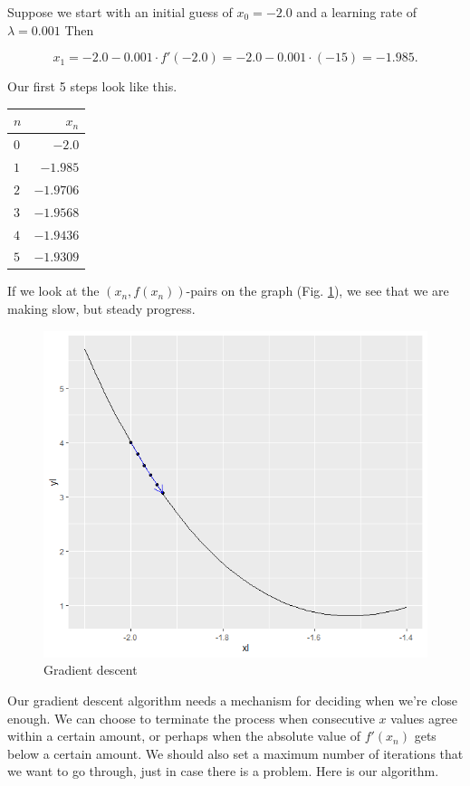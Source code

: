 \documentclass[
]{book}
\theoremstyle{definition}
\theoremstyle{definition}
\theoremstyle{definition}
\theoremstyle{definition}
\theoremstyle{remark}
\begin{document}
Suppose we start with an initial guess of \(x_0=-2.0\) and a learning rate of \(\lambda=0.001\) Then

\[x_1=-2.0-0.001\cdot f'(-2.0)=-2.0-0.001\cdot(-15)=-1.985.\]

Our first 5 steps look like this.

\begin{longtable}[]{@{}lr@{}}
\toprule\noalign{}
\(n\) & \(x_n\) \\
\midrule\noalign{}
\endhead
\bottomrule\noalign{}
\endlastfoot
\(0\) & \(-2.0\) \\
\(1\) & \(-1.985\) \\
\(2\) & \(-1.9706\) \\
\(3\) & \(-1.9568\) \\
\(4\) & \(-1.9436\) \\
\(5\) & \(-1.9309\) \\
\end{longtable}

If we look at the \((x_n,f(x_n))\)-pairs on the graph (Fig. \ref{fig:GD3}), we see that we are making slow, but steady progress.

\begin{figure}

{\centering \includegraphics[width=0.75\linewidth]{images/gd1} 

}

\caption{Gradient descent}\label{fig:GD3}
\end{figure}

Our gradient descent algorithm needs a mechanism for deciding when we're close enough. We can choose to terminate the process when consecutive \(x\) values agree within a certain amount, or perhaps when the absolute value of \(f'(x_n)\) gets below a certain amount. We should also set a maximum number of iterations that we want to go through, just in case there is a problem. Here is our algorithm.
\end{document}
